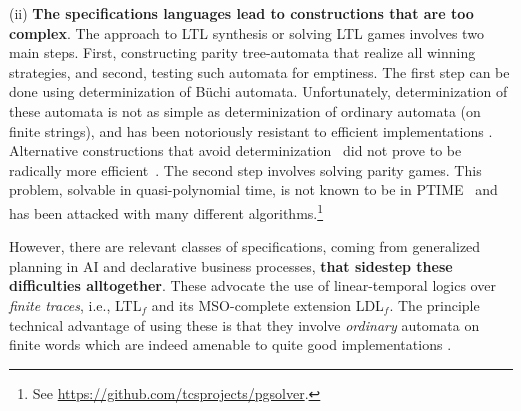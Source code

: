 (ii) \textbf{The specifications languages lead to constructions that
are too complex}.  The approach to LTL synthesis or solving LTL games
involves two main steps. First, constructing parity tree-automata that
realize all winning strategies, and second, testing such automata for
emptiness. The first step can be done using determinization of B\"uchi
automata. Unfortunately, determinization of these automata is not as
simple as determinization of ordinary automata (on finite strings),
and has been notoriously resistant to efficient implementations
\cite{TsaiFVT14}.  Alternative constructions that avoid
determinization~\cite{KupfermanV05,KupfermanPV06} did not prove to be
radically more efficient~\cite{FiliotJR11}. The second step involves
solving parity games. This problem, solvable in quasi-polynomial time,
is not known to be in PTIME~\cite{DBLP:conf/stoc/CaludeJKL017} and has
been attacked with many different algorithms.\footnote{See
\url{https://github.com/tcsprojects/pgsolver}.}


% 

However, there are relevant classes of specifications, coming from
generalized planning in AI and declarative business processes,
\textbf{that sidestep these difficulties alltogether}.  These advocate
the use of linear-temporal logics over \emph{finite traces}, i.e.,
LTL$_f$ and its MSO-complete extension LDL$_f$. The principle
technical advantage of using these is that they involve
\emph{ordinary} automata on finite words which are indeed amenable to
quite good implementations
\cite{AalstPS09,DeVa13,DeVa15,DeVa16,TorresB15,CamachoTMBM17}.



